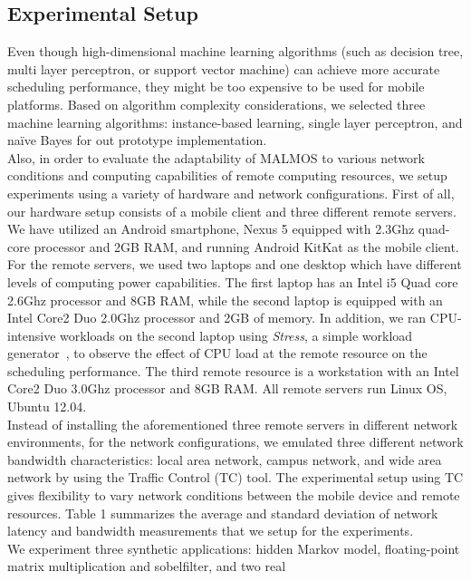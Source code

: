 \documentclass[10pt, conference, compsocconf]{IEEEtran}
\begin{document}
{{\subsection{Experimental Setup}
%
Even though high-dimensional machine learning algorithms (such as
decision tree, multi layer perceptron, or support vector machine) can
achieve more accurate scheduling performance, they might be too
expensive to be used for mobile platforms.
%
Based on algorithm complexity considerations, we selected three machine learning
algorithms: instance-based learning, single layer perceptron, and
na\"{i}ve Bayes for out prototype implementation.\\
%
\indent Also, in order to evaluate the adaptability of MALMOS to various
network conditions and computing capabilities of remote computing
resources, we setup experiments using a variety of hardware and
network configurations.
%
First of all, our hardware setup consists of a mobile client and three
different remote servers.
%
We have utilized an Android smartphone, Nexus 5 equipped with 2.3Ghz
quad-core processor and 2GB RAM, and running Android KitKat as the
mobile client.
%
For the remote servers, we used two laptops and one desktop which have
different levels of computing power capabilities.
%
The first laptop has an Intel i5 Quad core 2.6Ghz processor and 8GB RAM, while
the second laptop is equipped with an Intel Core2 Duo 2.0Ghz processor and 2GB
of memory.
%
In addition, we ran CPU-intensive workloads on the second laptop using
\textit{Stress}, a simple workload generator~\cite{stress}, to observe 
the effect of CPU load at the remote resource on the scheduling performance.
%
The third remote resource is a workstation with an Intel Core2 Duo 3.0Ghz processor
and 8GB RAM.
%
All remote servers run Linux OS, Ubuntu 12.04.\\
%
\indent Instead of installing the aforementioned three remote servers in
different network environments, for the network configurations, we
emulated three different network bandwidth characteristics: local area
network, campus network, and wide area network by using the Traffic
Control (TC) tool. 
%
The experimental setup using TC gives flexibility to vary network
conditions between the mobile device and remote resources.
%
Table 1 summarizes the average and standard deviation of network
latency and bandwidth measurements that we setup for the experiments.\\
%
\indent We experiment three synthetic applications: hidden Markov
model, floating-point matrix multiplication and sobelfilter, and two real
}}
\end{document}
